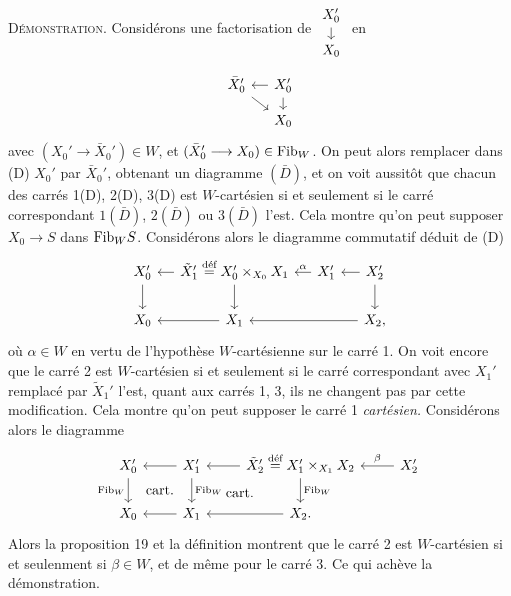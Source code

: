 \textsc{Démonstration}. Considérons une factorisation de $\begin{tikzcd}[ampersand replacement=\&, row sep=small] X_0' \arrow[d] \\ X_0 \end{tikzcd}$ en
\[
\begin{tikzcd}[ampersand replacement=\&, column sep=small, row sep=small]
\bar{X}_0' \arrow[dr] \& X_0' \arrow[l] \arrow[d] \\
\& X_0
\end{tikzcd}
\]
avec $(X_0'\longrightarrow\bar{X}_0')\in W$, et $(\bar{X}_0'\longrightarrow X_0)\in\mathrm{Fib}_W$. On peut alors remplacer dans (D) $X_0'$ par $\bar{X}_0'$, obtenant un diagramme $(\bar{D})$, et on voit aussitôt
que chacun des carrés 1(D), 2(D), 3(D) est $W$-cartésien si et seulement si le carré correspondant $1(\bar{D})$, $2(\bar{D})$ ou $3(\bar{D})$ l'est. Cela montre qu'on peut supposer $X_0\longrightarrow S$ dans $\mathrm{Fib}_W S$. Considérons alors le diagramme commutatif déduit de (D)
\[
\begin{tikzcd}[ampersand replacement=\&, column sep=small]
X_0' \arrow[d] \& \tilde{X}_1'\overset{\text{déf}}{=}X_0'\times_{X_0}X_1 \arrow[l] \arrow[d] \& X_1' \arrow[l, "\alpha"'] \& X_2' \arrow[l] \arrow[d] \\
X_0 \& X_1 \arrow[l] \& \& X_2, \arrow[ll]
\end{tikzcd}
\]
où $\alpha\in W$ en vertu de l'hypothèse $W$-cartésienne sur le carré 1. On voit encore que le carré 2 est $W$-cartésien si et seulement si le carré correspondant avec $X_1'$ remplacé par $\tilde{X}_1'$ l'est, quant aux carrés 1, 3, ils ne changent pas par cette modification. Cela montre qu'on peut supposer le carré 1 \textit{cartésien.} Considérons alors le diagramme
\[
\begin{tikzcd}[ampersand replacement=\&]
X_0' \arrow[d, "\mathrm{Fib}_W"'] \& X_1' \arrow[l] \arrow[d, "\mathrm{Fib}_W"] \arrow[dl, phantom, "\text{cart.}"] \& \tilde{X}_2'\overset{\text{déf}}{=}X_1'\times_{X_1}X_2 \arrow[l] \arrow[d, "\mathrm{Fib}_W"] \arrow[dl, phantom, "\text{cart.}"] \& X_2' \arrow[l, "\beta"'] \\
X_0 \& X_1 \arrow[l] \& X_2. \arrow[l]
\end{tikzcd}
\]
Alors la proposition 19 et la définition montrent que le carré 2 est $W$-cartésien si et seulenment si $\beta\in W$, et de même pour le carré 3. Ce qui achève la démonstration. %

